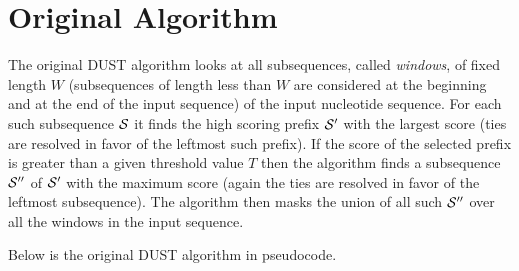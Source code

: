 \documentclass{article}
\newcommand{\cals}{{\cal S}}
\begin{document}
\section{Original Algorithm}

The original DUST algorithm looks at all subsequences, called {\em windows},
of fixed length $W$ (subsequences of length less than $W$ are considered at 
the beginning and at the end of the input sequence) of the input nucleotide 
sequence.  For each such subsequence $\cals$ it finds the high scoring prefix 
$\cals'$ with the largest score (ties are resolved in favor of the leftmost
such prefix). If the score of the selected prefix is greater than a given
threshold value $T$ then the algorithm finds a subsequence $\cals''$ of $\cals'$ 
with the maximum score (again the ties are resolved in favor of the leftmost 
subsequence). The algorithm then masks the union of all such $\cals''$ over 
all the windows in the input sequence.

Below is the original DUST algorithm in pseudocode.
\end{document}
